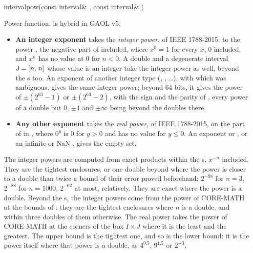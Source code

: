\documentclass[12pt,a4paper,twoside,openright]{book}
\begin{document}
\begin{deffun}{interval}{pow}{(const interval\& , const interval\& )}
  \begin{operation}
  \end{operation}
  Power function.  is hybrid in GAOL v5.\newinvfive
  \begin{itemize}
  \item[$\bullet$] \textbf{An integer exponent} takes the \emph{integer
    power},  of IEEE 1788-2015:  to the power ,
    the negative part of  included, where $x^0=1$ for every $x$, 0
    included, and $x^n$ has no value at 0 for $n<0$. A double  and a
    degenerate interval $\textsl{J}=[n,\,n]$ whose value is an integer take
    the integer power as well, beyond the s too.\newinvfive{} An
    exponent  of another integer type (, ,
    \dots), with which  was ambiguous, gives the same
    integer power; beyond 64 bits, it gives the power of $\pm(2^{63}-1)$ or
    $\pm(2^{63}-2)$, with the sign and the parity of , every power of
    a double but $0$, $\pm1$ and $\pm\infty$ being beyond the doubles
    there.\newinvfive
  \item[$\bullet$] \textbf{Any other exponent} takes the \emph{real power},
     of IEEE 1788-2015, on the part of  in ,
    where $0^y$ is $0$ for $y>0$ and has no value for $y\leq0$. An exponent
    \itv{+\infty}{+\infty} or \itv{-\infty}{-\infty}, or an infinite or NaN
    , gives the empty set.
  \end{itemize}
  The integer powers are computed from exact products within the
  s, $x^{-n}$ included. They are the tightest enclosures, or one
  double beyond where the power is closer to a double than twice a bound of
  their error proved beforehand: $2^{-98}$ for $n=3$, $2^{-88}$ for
  $n=1000$, $2^{-62}$ at most, relatively. They are exact where the power is
  a double. Beyond the s, the integer powers come from the power of
  CORE-MATH at the bounds of : they are the tightest enclosures where
  $n$ is a double, and within three doubles of them
  otherwise.\newinvfive{} The real power takes the power of CORE-MATH at the
  corners of the box $I\times J$ where it is the least and the greatest. The
  upper bound is the tightest one, and so is the lower bound: it is the power
  itself where that power is a double, as $4^{0.5}$, $9^{1.5}$ or $2^{-3}$,

\end{deffun}
\end{document}
